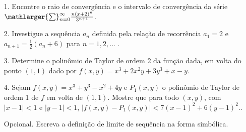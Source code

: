\documentclass[oneside,a4paper,12pt]{article}
\begin{document}
 \begin{itemize}
 	\item[1.]  Encontre o raio de convergência e o intervalo de convergência da série $\mathlarger{\sum}_{n=0}^{\infty} \frac{n(x+2)^{n}}{3^{n+1}}$.
 \end{itemize}
 \begin{itemize}
 	\item[2.] Investigue a sequência ${a_{n}}$ definida pela relação de recorrência $a_{1}=2$ e $a_{n+1}=\frac{1}{2}(a_{n}+6)$ para $n=1,2,...$  . 
 \end{itemize}
 \begin{itemize}
 	\item [3.] Determine o polinômio de Taylor de ordem 2 da função dada, em volta do ponto $(1,1)$ dado por  $f(x,y)=x^{3}+2x^{2}y+3y^{3}+x-y$. 
 \end{itemize}
 \begin{itemize}
 	\item[4.] Sejam $f(x,y)=x^{3}+y^{3}-x^{2}+4y$ e $P_{1}(x,y)$ o polinômio de Taylor de ordem 1 de $f$ em volta de $(1,1)$. Mostre que para todo $(x,y)$, com $|x-1|<1$ e $|y-1|<1$, $\left|f(x,y)-P_{1}(x,y)\right|<7(x-1)^{2}+6(y-1)^{2}$..
 \end{itemize}
\begin{itemize}
	\item[Opcional.] Escreva a definição de limite de sequência na forma simbólica.
\end{itemize}
\end{document}
